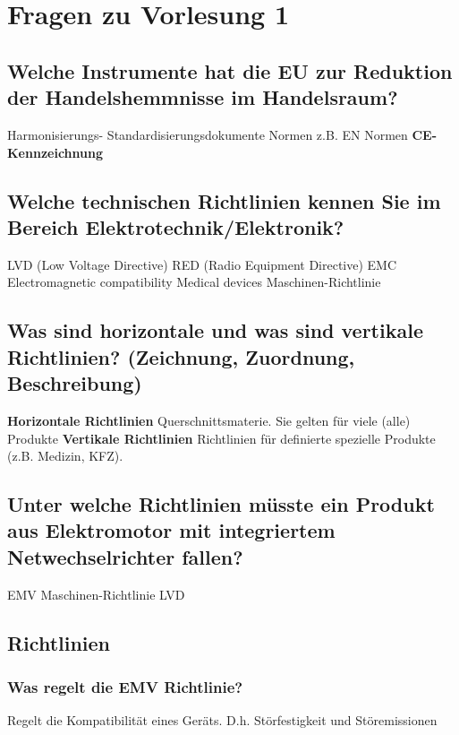 \section{Fragen zu Vorlesung 1}
\subsection{Welche Instrumente hat die EU zur Reduktion der Handelshemmnisse im Handelsraum?}
\begin{outline}
  \1 Harmonisierungs- Standardisierungsdokumente
  \1 Normen z.B. EN Normen
  \1 \textbf{CE-Kennzeichnung}
\end{outline}

\subsection{Welche technischen Richtlinien kennen Sie im Bereich Elektrotechnik/Elektronik?}
\begin{outline}
  \1 LVD (Low Voltage Directive)
  \1 RED (Radio Equipment Directive)
  \1 EMC {Electromagnetic compatibility}
  \1 Medical devices
  \1 Maschinen-Richtlinie
\end{outline}

\subsection{Was sind horizontale und was sind vertikale Richtlinien? (Zeichnung, Zuordnung, Beschreibung)}
\textbf{Horizontale Richtlinien}\p
Querschnittsmaterie. Sie gelten für viele (alle) Produkte\p
%
\textbf{Vertikale Richtlinien}\p
Richtlinien für definierte spezielle Produkte (z.B. Medizin, KFZ).

\subsection{Unter welche Richtlinien müsste ein Produkt aus Elektromotor mit integriertem Netwechselrichter fallen?}
\begin{outline}
  \1 EMV
  \1 Maschinen-Richtlinie
  \1 LVD
\end{outline}

\subsection{Richtlinien}
\subsubsection{Was regelt die EMV Richtlinie?}
Regelt die Kompatibilität eines Geräts. D.h. Störfestigkeit und Störemissionen

